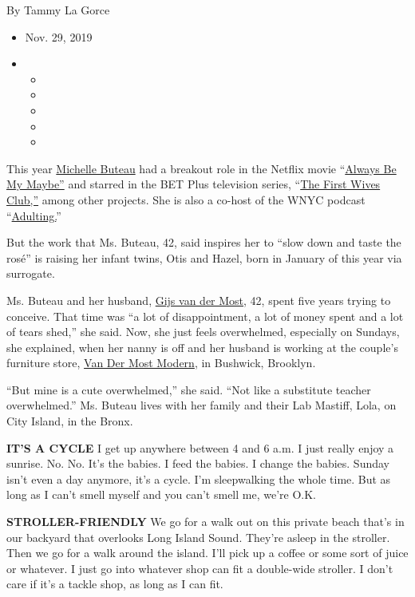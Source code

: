 By Tammy La Gorce

\begin{itemize}
\item
  Nov. 29, 2019
\item
  \begin{itemize}
  \item
  \item
  \item
  \item
  \item
  \end{itemize}
\end{itemize}

This year \href{http://michellebuteau.com}{Michelle Buteau} had a
breakout role in the Netflix movie
``\href{https://www.youtube.com/watch?v=iHBcWHY9lN4}{Always Be My
Maybe''} and starred in the BET Plus television series,
``\href{https://www.bet.com/celebrities/news/2019/09/19/5-things-you-need-to-know-about--first-wives-club-.html}{The
First Wives Club,''} among other projects. She is also a co-host of the
WNYC podcast
``\href{https://www.npr.org/podcasts/725509261/adulting}{Adulting.}''

But the work that Ms. Buteau, 42, said inspires her to ``slow down and
taste the rosé'' is raising her infant twins, Otis and Hazel, born in
January of this year via surrogate.

Ms. Buteau and her husband, \href{https://gijsvandermost.com/About}{Gijs
van der Most}, 42, spent five years trying to conceive. That time was
``a lot of disappointment, a lot of money spent and a lot of tears
shed,'' she said. Now, she just feels overwhelmed, especially on
Sundays, she explained, when her nanny is off and her husband is working
at the couple's furniture store, \href{https://vandermostmodern.com}{Van
Der Most Modern}, in Bushwick, Brooklyn.

``But mine is a cute overwhelmed,'' she said. ``Not like a substitute
teacher overwhelmed.'' Ms. Buteau lives with her family and their Lab
Mastiff, Lola, on City Island, in the Bronx.

\textbf{IT'S A CYCLE} I get up anywhere between 4 and 6 a.m. I just
really enjoy a sunrise. No. No. It's the babies. I feed the babies. I
change the babies. Sunday isn't even a day anymore, it's a cycle. I'm
sleepwalking the whole time. But as long as I can't smell myself and you
can't smell me, we're O.K.

\textbf{STROLLER-FRIENDLY} We go for a walk out on this private beach
that's in our backyard that overlooks Long Island Sound. They're asleep
in the stroller. Then we go for a walk around the island. I'll pick up a
coffee or some sort of juice or whatever. I just go into whatever shop
can fit a double-wide stroller. I don't care if it's a tackle shop, as
long as I can fit.

